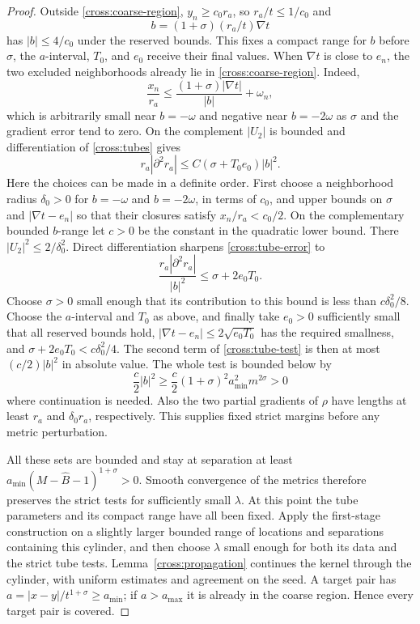 \begin{proof}
Outside \eqref{cross:coarse-region}, $y_n\ge c_0r_a$, so
$r_a/t\le1/c_0$ and
\[
 b=(1+\sigma)(r_a/t)\nabla t
\]
has $|b|\le4/c_0$ under the reserved bounds.  This fixes a compact
range for $b$ before $\sigma$, the $a$-interval, $T_0$, and $e_0$
receive their final values.  When $\nabla t$ is close to $e_n$, the two excluded
neighborhoods already lie in \eqref{cross:coarse-region}.  Indeed,
\[
 \frac{x_n}{r_a}
 \le \frac{(1+\sigma)|\nabla t|}{|b|}+\omega_n,
\]
which is arbitrarily small near $b=-\omega$ and negative near
$b=-2\omega$ as $\sigma$ and the gradient error tend to zero.
On the complement $|U_2|$ is bounded and differentiation of
\eqref{cross:tubes} gives
\begin{equation}\label{cross:tube-error}
 r_a|\partial^2r_a|
 \le C(\sigma+T_0e_0)|b|^2.
\end{equation}
Here the choices can be made in a definite order.  First choose a
neighborhood radius $\delta_0>0$ for $b=-\omega$ and $b=-2\omega$,
in terms of $c_0$, and upper bounds on $\sigma$ and
$|\nabla t-e_n|$ so that their closures satisfy $x_n/r_a<c_0/2$.
On the complementary bounded $b$-range let $c>0$ be the constant in the
quadratic lower bound.  There $|U_2|^2\le2/\delta_0^2$.
Direct differentiation sharpens \eqref{cross:tube-error} to
\[
 \frac{r_a|\partial^2r_a|}{|b|^2}
 \le\sigma+2e_0T_0.
\]
Choose $\sigma>0$ small enough that its contribution to this bound is
less than $c\delta_0^2/8$.  Choose the $a$-interval and $T_0$ as above,
and finally take $e_0>0$ sufficiently small that all reserved bounds hold,
$|\nabla t-e_n|\le2\sqrt{e_0T_0}$ has the required smallness, and
$\sigma+2e_0T_0<c\delta_0^2/4$.  The second term of
\eqref{cross:tube-test} is then at most $(c/2)|b|^2$ in absolute value.
The whole test is bounded below by
\[
 \frac c2|b|^2
 \ge\frac c2(1+\sigma)^2a_{\min}^2m^{2\sigma}>0
\]
where continuation is needed.  Also the two partial gradients of
$\rho$ have lengths at least $r_a$ and $\delta_0r_a$, respectively.
This supplies fixed strict margins before any metric perturbation.

All these sets are bounded and stay at separation at least
$a_{\min}(M-\widehat B-1)^{1+\sigma}>0$.  Smooth convergence of the metrics
therefore preserves the strict tests for sufficiently small $\lambda$.
At this point the tube parameters and its compact range have all been
fixed.  Apply the first-stage construction on a slightly larger bounded
range of locations and separations containing this cylinder, and then
choose $\lambda$ small enough for both its data and the strict tube
tests.  Lemma~\ref{cross:propagation} continues the kernel through the
cylinder, with uniform estimates and agreement on the seed.  A target pair has
$a=|x-y|/t^{1+\sigma}\ge a_{\min}$; if $a>a_{\max}$ it is already in
the coarse region.  Hence every target pair is covered.


\end{proof}
